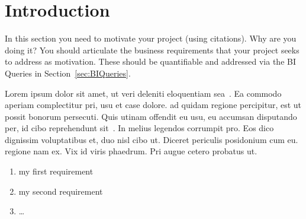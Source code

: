 
\section{Introduction}
\label{sec:Introduction}

In this section you need to motivate your project (using citations). Why are you doing it? You should articulate the business requirements that your project seeks to address as motivation. These should be quantifiable and addressed via the BI Queries in Section~\ref{sec:BIQueries}.

Lorem ipsum dolor sit amet, ut veri deleniti eloquentiam sea~\cite{FengB16}. Ea commodo aperiam complectitur pri, usu et case dolore. \cite{KuneKARB16} ad quidam regione percipitur, est ut possit bonorum persecuti. Quis utinam offendit eu usu, eu accumsan disputando per, id cibo reprehendunt sit~\cite{BeloglazovB15,GomesCT15}. In melius legendos corrumpit pro. Eos dico dignissim voluptatibus et, duo nisl cibo ut. Diceret periculis posidonium cum eu. \cite{GomesCT15} regione nam ex. Vix id viris phaedrum. Pri augue cetero probatus ut.

\begin{enumerate}[label=(Req-\arabic*)]
\item my first requirement
\item my second requirement
\item \ldots
\end{enumerate}